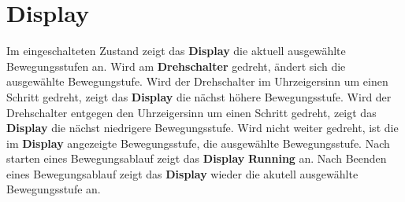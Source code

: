 %
%

\chapter{Display}



Im eingeschalteten Zustand zeigt das \textbf{Display} die aktuell ausgewählte Bewegungsstufen an. Wird am \textbf{Drehschalter} gedreht, ändert sich die ausgewählte Bewegungstufe. Wird der Drehschalter im Uhrzeigersinn um einen Schritt gedreht, zeigt das \textbf{Display} die nächst höhere Bewegungsstufe. Wird der Drehschalter entgegen den Uhrzeigersinn um einen Schritt gedreht, zeigt das \textbf{Display} die nächst niedrigere Bewegungsstufe. Wird nicht weiter gedreht, ist die im \textbf{Display} angezeigte Bewegungsstufe, die ausgewählte Bewegungsstufe. Nach starten eines Bewegungsablauf zeigt das \textbf{Display} \textbf{Running} an. Nach Beenden eines Bewegungsablauf zeigt das \textbf{Display} wieder die akutell ausgewählte Bewegungsstufe an. 

